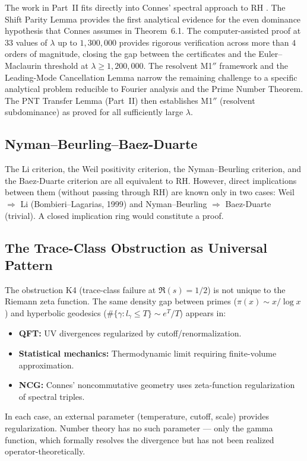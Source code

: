 \documentclass[12pt,a4paper]{article}
\theoremstyle{definition}
\theoremstyle{remark}
\begin{document}
The work in Part~II fits directly into Connes' spectral approach to RH \cite{Connes2025}. The Shift Parity Lemma provides the first analytical evidence for the even dominance hypothesis that Connes assumes in Theorem~6.1. The computer-assisted proof at $33$ values of $\lambda$ up to $1{,}300{,}000$ provides rigorous verification across more than $4$ orders of magnitude, closing the gap between the certificates and the Euler--Maclaurin threshold at $\lambda \geq 1{,}200{,}000$. The resolvent M1$''$ framework and the Leading-Mode Cancellation Lemma narrow the remaining challenge to a specific analytical problem reducible to Fourier analysis and the Prime Number Theorem. The PNT Transfer Lemma (Part~II) then establishes M1$''$ (resolvent subdominance) as proved for all sufficiently large $\lambda$.

\subsection{Nyman--Beurling--Baez-Duarte}

The Li criterion, the Weil positivity criterion, the Nyman--Beurling criterion, and the Baez-Duarte criterion are all equivalent to RH. However, direct implications between them (without passing through RH) are known only in two cases: Weil $\Rightarrow$ Li (Bombieri--Lagarias, 1999) and Nyman--Beurling $\Rightarrow$ Baez-Duarte (trivial). A closed implication ring would constitute a proof.

\subsection{The Trace-Class Obstruction as Universal Pattern}

The obstruction K4 (trace-class failure at $\Re(s) = 1/2$) is not unique to the Riemann zeta function. The same density gap between primes ($\pi(x) \sim x/\log x$) and hyperbolic geodesics ($\#\{\gamma: l_\gamma \leq T\} \sim e^T/T$) appears in:
\begin{itemize}
  \item \textbf{QFT:} UV divergences regularized by cutoff/renormalization.
  \item \textbf{Statistical mechanics:} Thermodynamic limit requiring finite-volume approximation.
  \item \textbf{NCG:} Connes' noncommutative geometry uses zeta-function regularization of spectral triples.
\end{itemize}
In each case, an external parameter (temperature, cutoff, scale) provides regularization. Number theory has no such parameter --- only the gamma function, which formally resolves the divergence but has not been realized operator-theoretically.
\end{document}
